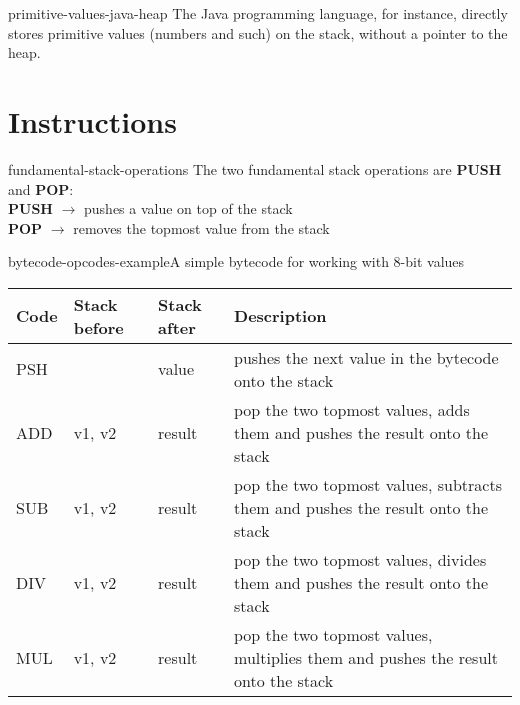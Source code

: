 \documentclass[preview]{standalone}
\begin{document}
\begin{snippet}{primitive-values-java-heap}
    The Java programming language, for instance, directly stores primitive values (numbers and such) on the stack, without a pointer to the heap.
\end{snippet}

\section{Instructions}

\begin{snippet}{fundamental-stack-operations}
    The two fundamental stack operations are \textbf{PUSH} and \textbf{POP}:
    \\
    \textbf{PUSH} \(\rightarrow\) pushes a value on top of the stack
    \\
    \textbf{POP} \(\rightarrow\) removes the topmost value from the stack
\end{snippet}

\begin{snippetexample}{bytecode-opcodes-example}{A simple bytecode for working with 8-bit values}
    \bgroup{}
    \def\arraystretch{1.25}
    \begin{center}
        \begin{tabular}{ |l|l|l|p{7cm}| }
            \hline
            \textbf{Code} & \textbf{Stack before} & \textbf{Stack after} & \textbf{Description} \\
            \hline
            PSH &  & value & pushes the next value in the bytecode onto the stack \\
            \hline
            ADD & v1, v2 & result & pop the two topmost values, adds them and pushes the result onto the stack \\
            \hline
            SUB & v1, v2 & result & pop the two topmost values, subtracts them and pushes the result onto the stack \\
            \hline
            DIV & v1, v2 & result & pop the two topmost values, divides them and pushes the result onto the stack \\
            \hline
            MUL & v1, v2 & result & pop the two topmost values, multiplies them and pushes the result onto the stack \\
            \hline
        \end{tabular}
    \end{center}
    \egroup{}
\end{snippetexample}
\end{document}
